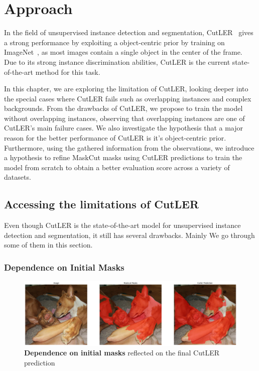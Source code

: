 \chapter{Approach}\label{chap:approach}

In the field of unsupervised instance detection and segmentation, CutLER~\cite{wang2023cut} gives a strong performance by exploiting a object-centric prior by training on ImageNet~\cite{deng2009imagenet}, as most images contain a single
object in the center of the frame.  Due to its strong instance discrimination abilities, CutLER is the current state-of-the-art method for this task.

In this chapter, we are exploring the limitation of CutLER, looking deeper into the special cases where CutLER fails such as overlapping instances and complex backgrounds. From the drawbacks of CutLER, we propose to train the model without overlapping instances, observing that overlapping instances are one of CutLER's main failure cases. We also investigate the hypothesis that a major reason for the better performance of CutLER is it's object-centric prior. Furthermore, using the gathered information from the observations, we introduce a hypothesis to refine MaskCut masks using CutLER predictions to train the model from scratch to obtain a better evaluation score across a variety of datasets.

\section{Accessing the limitations of CutLER}
Even though CutLER is the state-of-the-art model for unsupervised instance detection and segmentation, it still has several drawbacks. Mainly We go through some of them in this section.

\subsection{Dependence on Initial Masks}
\begin{figure}
	\centering
	\includegraphics[width=1\textwidth]{Images/main/cutler_problem_3.png}
	\caption[\textbf{Dependence on Initial Masks}]{\textbf{Dependence on initial masks} reflected on the final CutLER prediction}
	\label{fig:intial_mask_dependence}
\end{figure}

